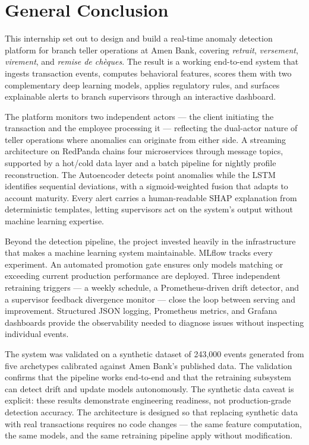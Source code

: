 \chapter*{General Conclusion}

This internship set out to design and build a real-time anomaly detection platform for branch teller operations at Amen Bank, covering \emph{retrait}, \emph{versement}, \emph{virement}, and \emph{remise de ch\`eques}. The result is a working end-to-end system that ingests transaction events, computes behavioral features, scores them with two complementary deep learning models, applies regulatory rules, and surfaces explainable alerts to branch supervisors through an interactive dashboard.

The platform monitors two independent actors --- the client initiating the transaction and the employee processing it --- reflecting the dual-actor nature of teller operations where anomalies can originate from either side. A streaming architecture on RedPanda chains four microservices through message topics, supported by a hot/cold data layer and a batch pipeline for nightly profile reconstruction. The Autoencoder detects point anomalies while the LSTM identifies sequential deviations, with a sigmoid-weighted fusion that adapts to account maturity. Every alert carries a human-readable SHAP explanation from deterministic templates, letting supervisors act on the system's output without machine learning expertise.

Beyond the detection pipeline, the project invested heavily in the infrastructure that makes a machine learning system maintainable. MLflow tracks every experiment. An automated promotion gate ensures only models matching or exceeding current production performance are deployed. Three independent retraining triggers --- a weekly schedule, a Prometheus-driven drift detector, and a supervisor feedback divergence monitor --- close the loop between serving and improvement. Structured JSON logging, Prometheus metrics, and Grafana dashboards provide the observability needed to diagnose issues without inspecting individual events.

The system was validated on a synthetic dataset of 243{,}000 events generated from five archetypes calibrated against Amen Bank's published data. The validation confirms that the pipeline works end-to-end and that the retraining subsystem can detect drift and update models autonomously. The synthetic data caveat is explicit: these results demonstrate engineering readiness, not production-grade detection accuracy. The architecture is designed so that replacing synthetic data with real transactions requires no code changes --- the same feature computation, the same models, and the same retraining pipeline apply without modification.

